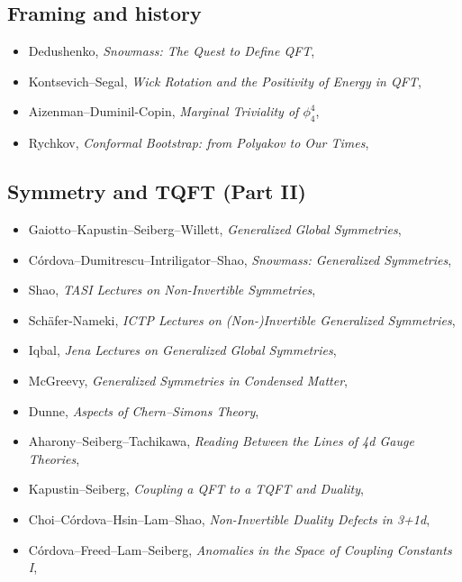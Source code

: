 \subsection*{Framing and history}
\begin{itemize}
\item[$\bullet$] Dedushenko, \emph{Snowmass: The Quest to Define QFT}, 
\item[$\circ$] Kontsevich--Segal, \emph{Wick Rotation and the Positivity of Energy in QFT}, 
\item[$\circ$] Aizenman--Duminil-Copin, \emph{Marginal Triviality of $\phi^4_4$}, 
\item[$\bullet$] Rychkov, \emph{Conformal Bootstrap: from Polyakov to Our Times}, 
\end{itemize}

\subsection*{Symmetry and TQFT (Part II)}
\begin{itemize}
\item[$\circ$] Gaiotto--Kapustin--Seiberg--Willett, \emph{Generalized Global Symmetries}, 
\item[$\bullet$] C\'ordova--Dumitrescu--Intriligator--Shao, \emph{Snowmass: Generalized Symmetries}, 
\item[$\bullet$] Shao, \emph{TASI Lectures on Non-Invertible Symmetries}, 
\item[$\bullet$] Sch\"afer-Nameki, \emph{ICTP Lectures on (Non-)Invertible Generalized Symmetries}, 
\item[$\bullet$] Iqbal, \emph{Jena Lectures on Generalized Global Symmetries}, 
\item[$\bullet$] McGreevy, \emph{Generalized Symmetries in Condensed Matter}, 
\item[$\bullet$] Dunne, \emph{Aspects of Chern--Simons Theory}, 
\item[$\circ$] Aharony--Seiberg--Tachikawa, \emph{Reading Between the Lines of 4d Gauge Theories}, 
\item[$\circ$] Kapustin--Seiberg, \emph{Coupling a QFT to a TQFT and Duality}, 
\item[$\circ$] Choi--C\'ordova--Hsin--Lam--Shao, \emph{Non-Invertible Duality Defects in 3+1d}, 
\item[$\circ$] C\'ordova--Freed--Lam--Seiberg, \emph{Anomalies in the Space of Coupling Constants I}, 
\end{itemize}

